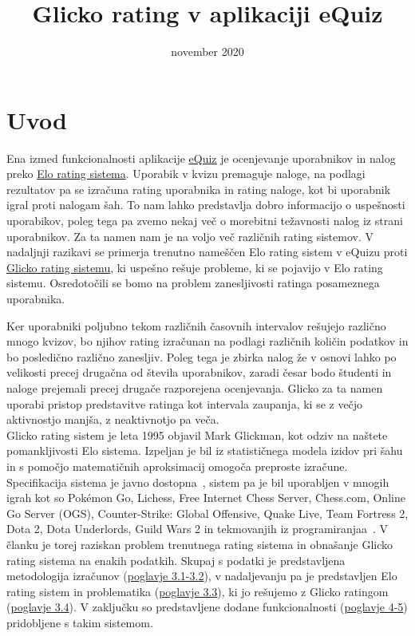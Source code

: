 \documentclass{IEEEtran}
\title{Glicko rating v aplikaciji eQuiz}
\date{november 2020}
\begin{document}
\maketitle

\section{Uvod}
\label{sec:intro}
Ena izmed funkcionalnosti aplikacije \href{https://equiz.fri1.uni-lj.si}{eQuiz} 
je ocenjevanje uporabnikov in nalog preko \href{https://en.wikipedia.org/wiki/Elo_rating_system}{Elo rating sistema}. Uporabik v kvizu premaguje naloge, na
podlagi rezultatov pa se izračuna rating uporabnika in rating naloge, kot bi uporabnik igral proti nalogam šah. To nam lahko predstavlja dobro informacijo o uspešnosti uporabikov, poleg tega pa zvemo nekaj več o morebitni težavnosti nalog iz strani uporabnikov. Za ta namen nam je na voljo več različnih rating sistemov. V nadaljnji razikavi se primerja trenutno nameščen Elo rating sistem v eQuizu proti \href{http://www.glicko.net/glicko/glicko.pdf}{Glicko rating sistemu}, ki uspešno rešuje probleme, ki se pojavijo v Elo rating sistemu. Osredotočili se bomo na problem zanesljivosti ratinga posameznega uporabnika.

Ker uporabniki poljubno tekom različnih časovnih intervalov rešujejo različno mnogo kvizov, bo njihov rating izračunan na podlagi različnih količin podatkov
in bo posledično različno zanesljiv. Poleg tega je zbirka nalog že v osnovi lahko po velikosti precej drugačna od števila uporabnikov, zaradi česar bodo študenti in naloge prejemali precej drugače razporejena ocenjevanja. Glicko za ta namen uporabi pristop predstavitve ratinga kot intervala zaupanja, ki se z večjo aktivnostjo manjša, z neaktivnotjo pa veča. 
\hfill
\\

Glicko rating sistem je leta 1995 objavil Mark Glickman, kot odziv na naštete pomankljivosti Elo sistema. Izpeljan je bil iz statističnega modela
izidov pri šahu in s pomočjo matematičnih aproksimacij omogoča preproste izračune. Specifikacija sistema je javno dostopna~\cite{glickoDoc}, sistem
pa je bil uporabljen v mnogih igrah kot so Pokémon Go, Lichess, Free Internet Chess Server, Chess.com, Online Go Server (OGS), Counter-Strike: Global Offensive, Quake Live, Team Fortress 2, Dota 2, Dota Underlords, Guild Wars 2 in tekmovanjih iz programiranjaa~\cite{glickoWiki}.
\newpage
V članku je torej raziskan problem trenutnega rating sistema in obnašanje Glicko rating sistema na enakih podatkih. Skupaj s podatki je predstavljena 
metodologija izračunov (\hyperref[sec:izracuni]{poglavje 3.1-3.2}), v nadaljevanju pa je predstavljen Elo rating sistem in problematika (\hyperref[sec:elo]{poglavje 3.3}), ki jo rešujemo z Glicko ratingom  (\hyperref[sec:glicko]{poglavje 3.4}). V zaključku so predstavljene dodane funkcionalnosti (\hyperref[sec:glicko]{poglavje 4-5}) pridobljene s takim sistemom.
\end{document}
